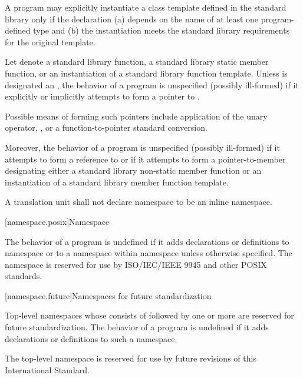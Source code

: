 \pnum
A program may explicitly instantiate
a class template defined in the standard library
only if the declaration
(a) depends on the name of at least one program-defined type
and
(b) the instantiation meets the standard library requirements for the
original template.

\pnum
Let  denote
a standard library function,
a standard library static member function,
or an instantiation
of a standard library function template.
Unless  is designated
an ,
the behavior of a \Cpp{} program is unspecified (possibly ill-formed)
if it explicitly or implicitly attempts
to form a pointer
to .
\begin{note}
Possible means of forming such pointers include
application of the unary \tcode{\&} operator,
,
or
a function-to-pointer standard conversion.
\end{note}
Moreover,
the behavior of a \Cpp{} program is unspecified (possibly ill-formed)
if it attempts to form a reference
to 
or
if it attempts to form a pointer-to-member designating
either a standard library non-static member function
or an instantiation of a standard library member function template.

\pnum
A translation unit shall not declare namespace  to be an inline namespace.

[namespace.posix]{Namespace }

\pnum
The behavior of a \Cpp{} program is undefined if it adds declarations or definitions to namespace
or to a namespace within namespace
unless otherwise specified. The namespace  is reserved for use by
ISO/IEC/IEEE 9945 and other POSIX standards.

[namespace.future]{Namespaces for future standardization}

\pnum
Top-level namespaces whose  consists of 
followed by one or more 
are reserved for future standardization.
The behavior of a \Cpp{} program is undefined if
it adds declarations or definitions to such a namespace.
\begin{example}
The top-level namespace  is reserved
for use by future revisions of this International Standard.
\end{example}


